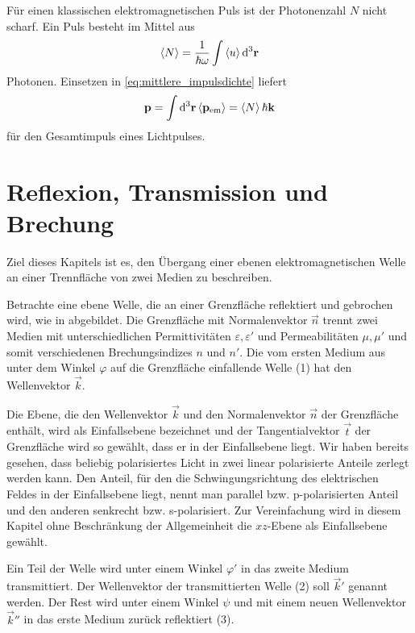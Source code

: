 Für einen klassischen elektromagnetischen Puls ist der Photonenzahl $N$ nicht scharf. Ein Puls besteht im Mittel aus
\begin{align*}
    \left\langle N\right\rangle = \frac{1}{\hbar\omega} \int \left\langle u\right\rangle \diffa[3]{\vec r}
\end{align*}
Photonen. Einsetzen in \eqref{eq:mittlere_impulsdichte} liefert
\begin{align*}
    \vec p = \int\diffa[3]{\vec r}\left\langle\vec p_\mathrm{em}\right\rangle = \left\langle N\right\rangle \hbar\vec k
\end{align*}
für den Gesamtimpuls eines Lichtpulses.




\section{Reflexion, Transmission und Brechung}

Ziel dieses Kapitels ist es, den Übergang einer ebenen elektromagnetischen Welle an einer Trennfläche von zwei Medien zu beschreiben.

Betrachte eine ebene Welle, die an einer Grenzfläche reflektiert und gebrochen wird, wie in  abgebildet.
Die Grenzfläche mit Normalenvektor $\vec n$ trennt zwei Medien mit unterschiedlichen Permittivitäten $\varepsilon,\varepsilon'$ und Permeabilitäten $\mu,\mu'$ und somit verschiedenen Brechungsindizes $n$ und $n'$.
Die vom ersten Medium aus unter dem Winkel $\varphi$ auf die Grenzfläche einfallende Welle (1) hat den Wellenvektor $\vec k$.

Die Ebene, die den Wellenvektor $\vec k$ und den Normalenvektor $\vec n$ der Grenzfläche enthält, wird als Einfallsebene bezeichnet und der Tangentialvektor $\vec t$ der Grenzfläche wird so gewählt, dass er in der Einfallsebene liegt.
Wir haben bereits gesehen, dass beliebig polarisiertes Licht in zwei linear polarisierte Anteile zerlegt werden kann. Den Anteil, für den die Schwingungsrichtung des elektrischen Feldes in der Einfallsebene liegt, nennt man parallel bzw. p-polarisierten Anteil und den anderen senkrecht bzw. s-polarisiert.
Zur Vereinfachung wird in diesem Kapitel ohne Beschränkung der Allgemeinheit die $xz$-Ebene als Einfallsebene gewählt.

Ein Teil der Welle wird unter einem Winkel $\varphi'$ in das zweite Medium transmittiert. Der Wellenvektor der transmittierten Welle (2) soll $\vec k'$ genannt werden.
Der Rest wird unter einem Winkel $\psi$ und mit einem neuen Wellenvektor $\vec k''$ in das erste Medium zurück reflektiert (3).

